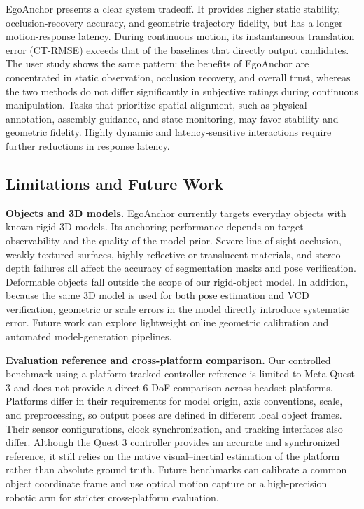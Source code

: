 \documentclass[review]{vgtc}
\begin{document}
EgoAnchor presents a clear system tradeoff. It provides higher static stability, occlusion-recovery accuracy, and geometric trajectory fidelity, but has a longer motion-response latency. During continuous motion, its instantaneous translation error (CT-RMSE) exceeds that of the baselines that directly output candidates. The user study shows the same pattern: the benefits of EgoAnchor are concentrated in static observation, occlusion recovery, and overall trust, whereas the two methods do not differ significantly in subjective ratings during continuous manipulation. Tasks that prioritize spatial alignment, such as physical annotation, assembly guidance, and state monitoring, may favor stability and geometric fidelity. Highly dynamic and latency-sensitive interactions require further reductions in response latency.

\subsection{Limitations and Future Work}

\textbf{Objects and 3D models.}
EgoAnchor currently targets everyday objects with known rigid 3D models. Its anchoring performance depends on target observability and the quality of the model prior. Severe line-of-sight occlusion, weakly textured surfaces, highly reflective or translucent materials, and stereo depth failures all affect the accuracy of segmentation masks and pose verification. Deformable objects fall outside the scope of our rigid-object model. In addition, because the same 3D model is used for both pose estimation and VCD verification, geometric or scale errors in the model directly introduce systematic error. Future work can explore lightweight online geometric calibration and automated model-generation pipelines.

\textbf{Evaluation reference and cross-platform comparison.}
Our controlled benchmark using a platform-tracked controller reference is limited to Meta Quest 3 and does not provide a direct 6-DoF comparison across headset platforms. Platforms differ in their requirements for model origin, axis conventions, scale, and preprocessing, so output poses are defined in different local object frames. Their sensor configurations, clock synchronization, and tracking interfaces also differ. Although the Quest 3 controller provides an accurate and synchronized reference, it still relies on the native visual--inertial estimation of the platform rather than absolute ground truth. Future benchmarks can calibrate a common object coordinate frame and use optical motion capture or a high-precision robotic arm for stricter cross-platform evaluation.
\end{document}
